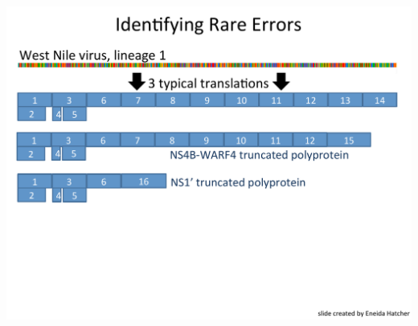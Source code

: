 \documentclass[landscape]{slides}
\begin{document}
\begin{slide}
\begin{center}
\includegraphics[height=8in]{figs/eneida-slide-2}
\vfill
\end{center}
\end{slide}
\end{document}
